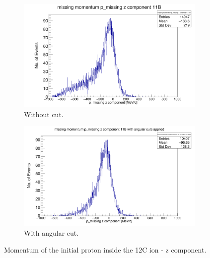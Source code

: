 \documentclass{report}
\begin{document}
\begin{figure}[ht]
\begin{subfigure}{.5\textwidth}
  \centering
  \includegraphics[width=\linewidth]{missing_mom_11B_z_comp.png}
  \caption{Without cut.}
  \label{fig:sub-first}
\end{subfigure}
\begin{subfigure}{.5\textwidth}
  \centering
  \includegraphics[width=\linewidth]{missing_mom_11B_z_comp_cut.png}
  \caption{With angular cut.}
  \label{fig:sub-second}
\end{subfigure}
\caption{Momentum of the initial proton inside the 12C ion - z component.}
\label{fig:missing_mom_11B_z_comp_cut.png}
\end{figure}
\end{document}
